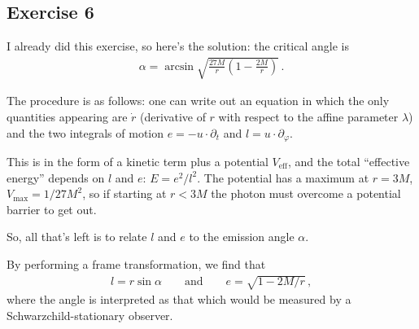 \documentclass[main.tex]{subfiles}
\begin{document}
\subsection{Exercise 6}

I already did this exercise, so here's the solution: the critical angle is 
%
\begin{align}
\alpha = \arcsin \sqrt{\frac{27M}{r} \left(1 - \frac{2M}{r}\right)}
\,.
\end{align}

The procedure is as follows: one can write out an equation in which the only quantities appearing are \(\dot{r}\) (derivative of \(r\) with respect to the affine parameter \(\lambda \)) and the two integrals of motion \(e = -u \cdot \partial_t\) and \(l = u \cdot \partial_\varphi \). 

This is in the form of a kinetic term plus a potential \(V _{\text{eff}}\), and the total ``effective energy'' depends on \(l\) and \(e\): \(E = e^2 / l^2\). 
The potential has a maximum at \(r= 3M\), \(V _{\text{max}} = 1/ 27 M^2\), so if starting at \(r < 3M\) the photon must overcome a potential barrier to get out.

So, all that's left is to relate \(l\) and \(e\) to the emission angle \(\alpha \). 

By performing a frame transformation, we find that %
\begin{align}
l = r \sin \alpha \qquad \text{and} \qquad
e = \sqrt{1 - 2M / r}
\,,
\end{align}
%
where the angle is interpreted as that which would be measured by a Schwarzchild-stationary observer.
\end{document}
